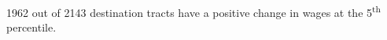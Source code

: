 1962 out of 2143 destination tracts have a positive change in wages at the 5\textsuperscript{th} percentile.
